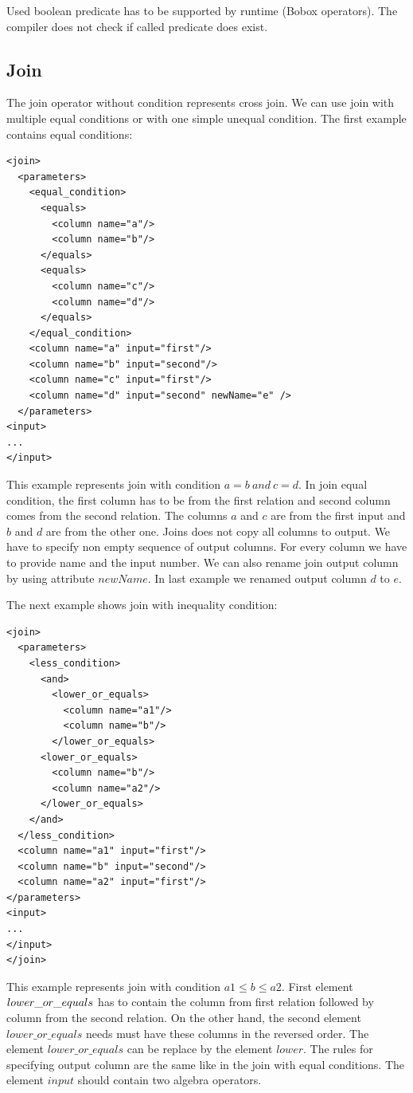 Used boolean predicate has to be supported by runtime (Bobox operators). The compiler does not check if called predicate does exist.

\subsection{Join}

The join operator without condition represents cross join. We can use join with multiple equal conditions or with one simple unequal condition. The first example contains equal conditions:

\begin{lstlisting}
<join>
  <parameters>
    <equal_condition>
      <equals>
        <column name="a"/>
        <column name="b"/>
      </equals>
      <equals>
        <column name="c"/>
        <column name="d"/>
      </equals>
    </equal_condition>
    <column name="a" input="first"/>
    <column name="b" input="second"/>
    <column name="c" input="first"/>
    <column name="d" input="second" newName="e" />
  </parameters>
<input>
...
</input>
\end{lstlisting}

This example represents join with condition $a=b~and~c=d$. In join equal condition, the first column has to be from the first relation and second column comes from the second relation. The columns $a$ and $c$ are from the first input and $b$ and $d$ are from the other one. Joins does not copy all columns to output. We have to specify non empty sequence of output columns. For every column we have to provide name and the input number. We can also rename join output column by using attribute $newName$. In last example we renamed output column $d$ to $e$.

The next example shows join with inequality condition:

\begin{lstlisting}
<join>
  <parameters>
    <less_condition>
      <and>
        <lower_or_equals>
          <column name="a1"/>
          <column name="b"/>
        </lower_or_equals>
      <lower_or_equals>
        <column name="b"/>
        <column name="a2"/>
      </lower_or_equals>
    </and>
  </less_condition>
  <column name="a1" input="first"/>
  <column name="b" input="second"/>
  <column name="a2" input="first"/>
</parameters>
<input>
...
</input>
</join>
\end{lstlisting}
This example represents join with condition $a1\leq b\leq a2$. First element $lower\_\-or\_\-equals$ has to contain the column from first relation followed by column from the second relation. On the other hand, the second element $lower\_or\_equals$ needs must have these columns in the reversed order. The element $lower\_or\_equals$ can be replace by the element $lower$. The rules for specifying output column are the same like in the join with equal conditions. The element $input$ should contain two algebra operators.

